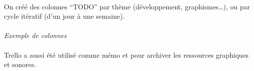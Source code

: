 \paragraph{}
On créé des colonnes “TODO” par thème (développement, graphismes…), ou par cycle itératif (d’un jour à une semaine).

\paragraph{}
\noindent
{}
\begin{center}
\textit{Exemple de colonnes}
\end{center}

\paragraph{}
Trello a aussi été utilisé comme mémo et pour archiver les ressources graphiques et sonores.

